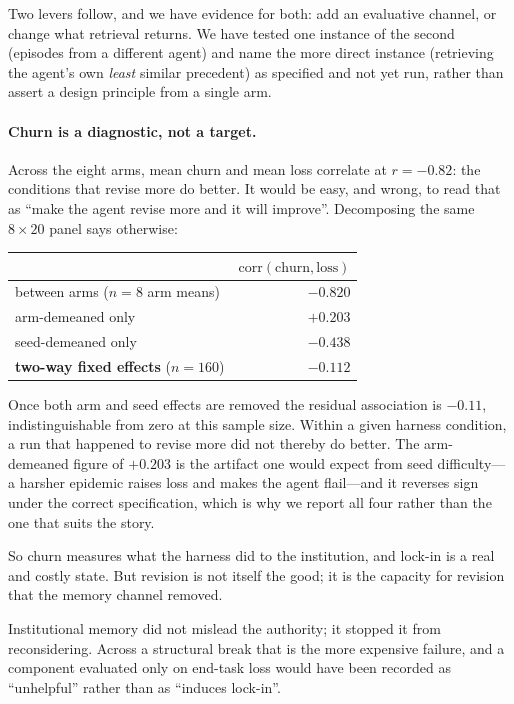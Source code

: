 \documentclass[11pt]{article}
\begin{document}
Two levers follow, and we have evidence for both: add an evaluative channel, or change what
retrieval returns. We have tested one instance of the second (episodes from a different agent) and
name the more direct instance (retrieving the agent's own \emph{least} similar precedent) as
specified and not yet run, rather than assert a design principle from a single arm.

\paragraph{Churn is a diagnostic, not a target.} Across the eight arms, mean churn and mean loss
correlate at $r=-0.82$: the conditions that revise more do better. It would be easy, and wrong, to
read that as ``make the agent revise more and it will improve''. Decomposing the same $8\times20$
panel says otherwise:

\begin{center}\small
\begin{tabular}{@{}lr@{}}
\toprule
& $\mathrm{corr}(\text{churn}, \text{loss})$ \\
\midrule
between arms ($n=8$ arm means) & $-0.820$ \\
arm-demeaned only & $+0.203$ \\
seed-demeaned only & $-0.438$ \\
\textbf{two-way fixed effects} ($n=160$) & $\mathbf{-0.112}$ \\
\bottomrule
\end{tabular}
\end{center}

Once both arm and seed effects are removed the residual association is $-0.11$, indistinguishable
from zero at this sample size. Within a given harness condition, a run that happened to revise more
did not thereby do better. The arm-demeaned figure of $+0.203$ is the artifact one would expect from
seed difficulty---a harsher epidemic raises loss and makes the agent flail---and it reverses sign
under the correct specification, which is why we report all four rather than the one that suits the
story.

So churn measures what the harness did to the institution, and lock-in is a real and costly state.
But revision is not itself the good; it is the capacity for revision that the memory channel removed.

\begin{takeaway}
Institutional memory did not mislead the authority; it stopped it from reconsidering. Across a
structural break that is the more expensive failure, and a component evaluated only on end-task loss
would have been recorded as ``unhelpful'' rather than as ``induces lock-in''.
\end{takeaway}
\end{document}
